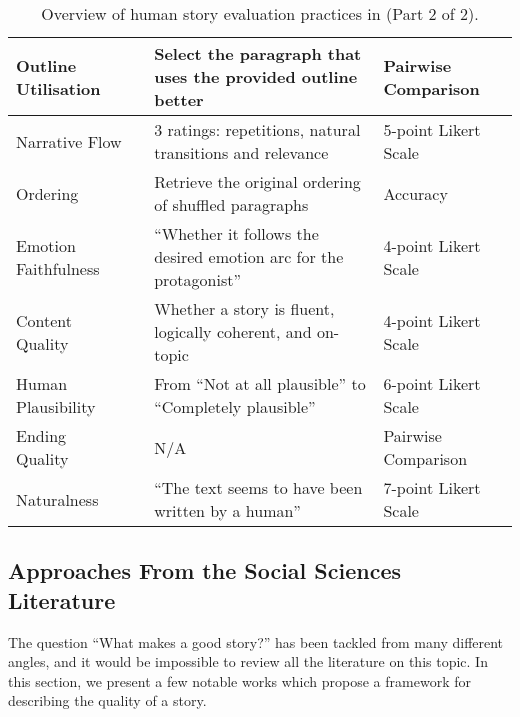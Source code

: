 {\begin{landscape}
\begin{table}
\begin{tabular}{llll}
                \midrule
                Outline Utilisation & \citet{rashkin-etal-2020-plotmachines} & Select the paragraph that uses the provided outline better & Pairwise Comparison \\
                \midrule
                Narrative Flow & \citet{rashkin-etal-2020-plotmachines} & 3 ratings: repetitions, natural transitions and relevance & 5-point Likert Scale \\
                \midrule
                Ordering & \citet{rashkin-etal-2020-plotmachines} & Retrieve the original ordering of shuffled paragraphs & Accuracy \\
                \midrule
                Emotion Faithfulness & \citet{brahman-etal-2020-cue} & ``Whether it follows the desired emotion arc for the protagonist'' & 4-point Likert Scale \\
                \midrule
                Content Quality & \citet{brahman-etal-2020-cue} & Whether a story is fluent, logically coherent, and on-topic & 4-point Likert Scale \\
                \midrule
                Human Plausibility & \citet{ghazarian-etal-2021-plot} & From ``Not at all plausible'' to ``Completely plausible'' & 6-point Likert Scale \\
                \midrule
                Ending Quality & \citet{bai2021semantics} & N/A & Pairwise Comparison \\
                \midrule
                Naturalness & \citet{pascual-etal-2021-plug-play} & ``The text seems to have been written by a human'' & 7-point Likert Scale \\
                \bottomrule
            \end{tabular}
            \caption{Overview of human story evaluation practices in {\asg} (Part 2 of 2).}
            \label{tab:overview_criteria_2}
        \end{table}
    \end{landscape}
    
    \clearpage
}

\restoregeometry

\subsection{Approaches From the Social Sciences Literature}
\label{sub:social_sciences}

The question ``What makes a good story?'' has been tackled from many different angles, and it would be impossible to review all the literature on this topic. In this section, we present a few notable works which propose a framework for describing the quality of a story.

